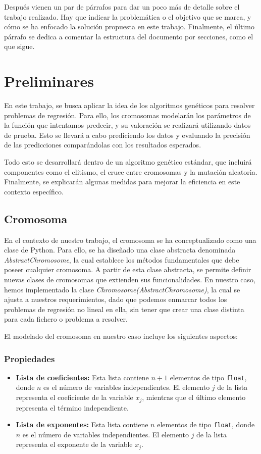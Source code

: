 \documentclass[conference,a4paper]{IEEEtran}
\begin{document}
Después vienen un par de párrafos para dar un poco más de detalle sobre el
trabajo realizado. Hay que indicar la problemática o el objetivo que se marca,
y cómo se ha enfocado la solución propuesta en este trabajo. Finalmente, el
último párrafo se dedica a comentar la estructura del documento por secciones,
como el que sigue.

\section{Preliminares}

En este trabajo, se busca aplicar la idea de los algoritmos genéticos para resolver problemas de regresión. Para ello, los cromosomas modelarán los parámetros de la función que intentamos predecir, y su valoración se realizará utilizando datos de prueba. Esto se llevará a cabo prediciendo los datos y evaluando la precisión de las predicciones comparándolas con los resultados esperados.

Todo esto se desarrollará dentro de un algoritmo genético estándar, que incluirá componentes como el elitismo, el cruce entre cromosomas y la mutación aleatoria. Finalmente, se explicarán algunas medidas para mejorar la eficiencia en este contexto específico.

\subsection{Cromosoma}

En el contexto de nuestro trabajo, el cromosoma se ha conceptualizado como una clase de Python. Para ello, se ha diseñado una clase abstracta denominada \textit{AbstractChromosome}, la cual establece los métodos fundamentales que debe poseer cualquier cromosoma. A partir de esta clase abstracta, se permite definir nuevas clases de cromosomas que extienden sus funcionalidades. En nuestro caso, hemos implementado la clase \textit{Chromosome(AbstractChromosome)}, la cual se ajusta a nuestros requerimientos, dado que podemos enmarcar todos los problemas de regresión no lineal en ella, sin tener que crear una clase distinta para cada fichero o problema a resolver.

El modelado del cromosoma en nuestro caso incluye los siguientes aspectos:

\subsubsection{Propiedades}
\begin{itemize}
    \item \textbf{Lista de coeficientes:} Esta lista contiene \( n + 1 \) elementos de tipo \texttt{float}, donde \( n \) es el número de variables independientes. El elemento \( j \) de la lista representa el coeficiente de la variable \( x_j \), mientras que el último elemento representa el término independiente.
    \item \textbf{Lista de exponentes:} Esta lista contiene \( n \) elementos de tipo \texttt{float}, donde \( n \) es el número de variables independientes. El elemento \( j \) de la lista representa el exponente de la variable \( x_j \).
\end{itemize}
\end{document}
